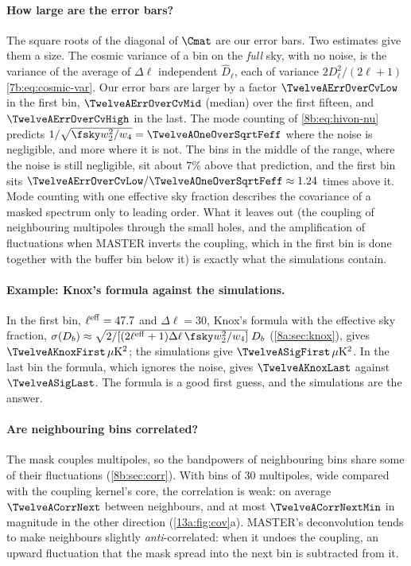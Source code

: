 \paragraph{How large are the error bars?} The square roots of the diagonal of $\Cmat$ are our error bars. Two
estimates give them a size. The cosmic variance of a bin on the \emph{full} sky, with no noise, is the
variance of the average of $\Delta\ell$ independent $\widehat D_\ell$, each of variance $2D_\ell^2/(2\ell+1)$
\eqref{7b:eq:cosmic-var}. Our error bars are larger by a factor $\TwelveAErrOverCvLow$ in the first bin,
$\TwelveAErrOverCvMid$ (median) over the first fifteen, and $\TwelveAErrOverCvHigh$ in the last. The mode
counting of \eqref{8b:eq:hivon-nu} predicts $1/\sqrt{\fsky w_2^2/w_4}=\TwelveAOneOverSqrtFeff$ where the noise is
negligible, and more where it is not. The bins in the middle of the range, where the noise is still negligible, sit about
$7\%$ above that prediction, and the first bin sits $\TwelveAErrOverCvLow/\TwelveAOneOverSqrtFeff\approx1.24$ times above it. Mode counting
with one effective sky fraction describes the covariance of a masked spectrum only to leading order. What it leaves out
(the coupling of neighbouring multipoles through the small holes, and the amplification of fluctuations when MASTER inverts the
coupling, which in the first bin is done together with the buffer bin below it) is exactly what the simulations contain.

\paragraph{Example: Knox's formula against the simulations.} In the first bin, $\ell^{\rm eff}=47.7$ and
$\Delta\ell=30$, Knox's formula with the effective sky fraction,
$\sigma(D_b)\approx\sqrt{2/[(2\ell^{\rm eff}+1)\Delta\ell\,\fsky w_2^2/w_4]}\;D_b$ (\cref{8a:sec:knox}), gives
$\TwelveAKnoxFirst\,\mu{\rm K}^2$; the simulations give $\TwelveASigFirst\,\mu{\rm K}^2$. In the last bin the
formula, which ignores the noise, gives $\TwelveAKnoxLast$ against $\TwelveASigLast$. The formula is a good
first guess, and the simulations are the answer.

\paragraph{Are neighbouring bins correlated?} The mask couples multipoles, so the bandpowers of
neighbouring bins share some of their fluctuations (\cref{8b:sec:corr}). With bins of $30$ multipoles, wide
compared with the coupling kernel's core, the correlation is weak: on average $\TwelveACorrNext$ between
neighbours, and at most $\TwelveACorrNextMin$ in magnitude in the other direction (\cref{13a:fig:cov}a).
MASTER's deconvolution tends to make neighbours slightly \emph{anti}-correlated: when it undoes the coupling, an
upward fluctuation that the mask spread into the next bin is subtracted from it.

